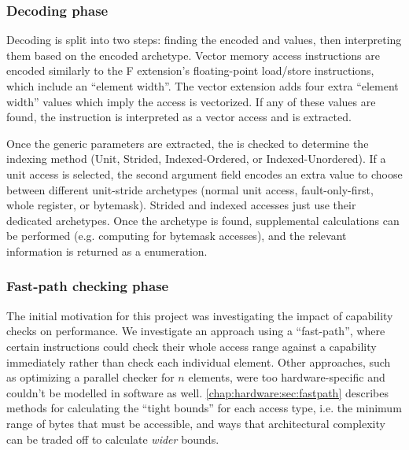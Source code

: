 \subsubsection{Decoding phase}\label{chap:hardware:subsec:decoding}
Decoding is split into two steps: finding the encoded  and  values, then interpreting them based on the encoded archetype.
Vector memory access instructions are encoded similarly to the F extension's floating-point load/store instructions, which include an ``element width''.
The vector extension adds four extra ``element width'' values which imply the access is vectorized.
If any of these values are found, the instruction is interpreted as a vector access and  is extracted.

Once the generic parameters are extracted, the  is checked to determine the indexing method (Unit, Strided, Indexed-Ordered, or Indexed-Unordered).
If a unit access is selected, the second argument field encodes an extra value to choose between different unit-stride archetypes (normal unit access, fault-only-first, whole register, or bytemask).
Strided and indexed accesses just use their dedicated archetypes.
Once the archetype is found, supplemental calculations can be performed (e.g. computing  for bytemask accesses), and the relevant information is returned as a  enumeration.


\subsubsection{Fast-path checking phase}\label{chap:hardware:subsec:checking}
The initial motivation for this project was investigating the impact of capability checks on performance.
We investigate an approach using a \enquote{fast-path}, where certain instructions could check their whole access range against a capability immediately rather than check each individual element.
Other approaches, such as optimizing a parallel checker for $n$ elements, were too hardware-specific and couldn't be modelled in software as well.
\cref{chap:hardware:sec:fastpath} describes methods for calculating the \enquote{tight bounds} for each access type, i.e. the minimum range of bytes that must be accessible, and ways that architectural complexity can be traded off to calculate \emph{wider} bounds.

